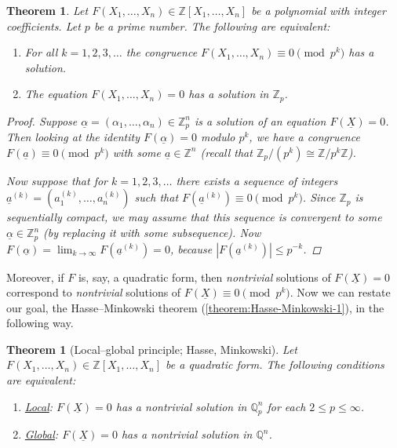 \documentclass{article}
\newcommand{\isom}{\cong}
\newcommand{\ZZ}{\mathbb{Z}}
\newcommand{\QQ}{\mathbb{Q}}
\theoremstyle{myplain}
\newtheorem{theorem}[proposition]{Theorem}
\theoremstyle{mydefinition}
\begin{document}
\begin{theorem}
  Let $F (X_1, \ldots, X_n) \in \ZZ [X_1,\ldots, X_n]$ be a polynomial with
  integer coefficients. Let $p$ be a prime number. The following are equivalent:
  \begin{enumerate}
  \item For all $k = 1,2,3,\ldots$ the congruence
    $F (X_1,\ldots,X_n) \equiv 0 \pmod{p^k}$ has a solution.

  \item The equation $F (X_1,\ldots,X_n) = 0$ has a solution in $\ZZ_p$.
  \end{enumerate}

  \begin{proof}
    Suppose $\underline{\alpha} = (\alpha_1,\ldots,\alpha_n) \in \ZZ_p^n$ is a
    solution of an equation $F (\underline{X}) = 0$. Then looking at the
    identity $F (\underline{\alpha}) = 0$ modulo $p^k$, we have a congruence
    $F (\underline{a}) \equiv 0 \pmod{p^k}$ with some $\underline{a} \in \ZZ^n$
    (recall that $\ZZ_p/(p^k) \isom \ZZ/p^k\ZZ$).

    Now suppose that for $k = 1,2,3,\ldots$ there exists a sequence of integers
    $\underline{a}^{(k)} = (a_1^{(k)}, \ldots, a_n^{(k)})$ such that
    $F (\underline{a}^{(k)}) \equiv 0 \pmod{p^k}$. Since $\ZZ_p$ is sequentially
    compact, we may assume that this sequence is convergent to some
    $\underline{\alpha} \in \ZZ_p^n$ (by replacing it with some
    subsequence). Now
    $F (\underline{\alpha}) = \lim_{k\to \infty} F (\underline{a}^{(k)}) = 0$,
    because $|F (\underline{a}^{(k)})| \le p^{-k}$.
  \end{proof}
\end{theorem}

Moreover, if $F$ is, say, a quadratic form, then \emph{nontrivial} solutions of
$F (\underline{X}) = 0$ correspond to \emph{nontrivial} solutions of
$F (\underline{X}) \equiv 0 \pmod{p^k}$. Now we can restate our goal, the
Hasse--Minkowski theorem (\ref{theorem:Hasse-Minkowski-1}), in the following
way.

\begin{theorem}[Local--global principle; Hasse, Minkowski]\label{theorem:Hasse-Minkowski-2}
  Let $F (X_1,\ldots,X_n) \in \ZZ [X_1,\ldots,X_n]$ be a quadratic form. The
  following conditions are equivalent:
  \begin{enumerate}
  \item \underline{Local}: $F (\underline{X}) = 0$ has a nontrivial solution in
    $\QQ_p^n$ for each $2 \le p \le \infty$.

  \item \underline{Global}: $F (\underline{X}) = 0$ has a nontrivial solution in
    $\QQ^n$.
  \end{enumerate}
\end{theorem}
\end{document}
